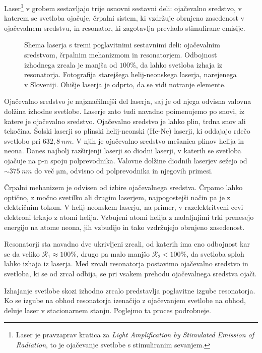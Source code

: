 Laser\footnote{Laser je pravzaprav kratica za {\it Light Amplification by Stimulated
Emission of Radiation}, to je ojačevanje svetlobe s stimuliranim sevanjem.} 
v grobem sestavljajo trije osnovni sestavni deli: ojačevalno sredstvo, 
v katerem se svetloba ojačuje, črpalni sistem, ki vzdržuje obrnjeno zasedenost
v ojačevalnem sredstvu, in resonator, ki zagotavlja prevlado stimulirane emisije.
\begin{figure}[h!]
\centering
\def\svgwidth{90truemm} 

\caption{Shema laserja s tremi poglavitnimi sestavnimi deli: ojačevalnim sredstvom, 
črpalnim mehanizmom in resonatorjem. Odbojnost izhodnega zrcala je manjša od $100\%$,
da lahko svetloba izhaja iz resonatorja. Fotografija starejšega helij-neonskega laserja, 
narejenega v Sloveniji. Ohišje laserja je odprto, da se vidi notranje elemente.
}
\label{fig:11_laser}
\end{figure}

Ojačevalno sredstvo je najznačilnejši del laserja, saj je od njega odvisna 
valovna dolžina izhodne svetlobe. Laserje zato tudi navadno poimenujemo
po snovi, iz katere je ojačevalno sredstvo.
Ojačevalno sredstvo je lahko plin, trdna snov ali tekočina.  
Šolski laserji so plinski helij-neonski (He-Ne) laserji, ki oddajajo 
rdečo svetlobo pri $632,8~\si{nm}$. V njih je ojačevalno sredstvo
mešanica plinov helija in neona. Danes najbolj razširjenji laserji so 
diodni laserji, v katerih se svetloba ojačuje na p-n spoju polprevodnika. 
Valovne dolžine diodnih laserjev sežejo od $\sim 375~\si{nm}$ do več 
$\si{\micro\meter}$, odvisno od polprevodnika in njegovih primesi.

Črpalni mehanizem je odvisen od izbire ojačevalnega sredstva. Črpamo lahko 
optično, z močno svetilko ali drugim laserjem, najpogostejši način pa je z
električnim tokom. V helij-neonskem laserju, na primer, v razelektritveni 
cevi elektroni trkajo z atomi helija. Vzbujeni atomi helija z nadaljnjimi
trki prenesejo energijo na atome neona, jih vzbudijo in tako vzdržujejo 
obrnjeno zasedenost.

Resonatorji sta navadno dve ukrivljeni zrcali, od katerih ima eno odbojnost
kar se da veliko $\mathcal{R}_1 \approx 100\%$, drugo pa malo manjšo 
$\mathcal{R}_2 < 100\%$, da svetloba sploh lahko izhaja iz laserja. 
Med zrcali resonatorja postavimo ojačevalno sredstvo in svetloba, ki se od 
zrcal odbija, se pri vsakem prehodu ojačevalnega sredstva ojači.

Izhajanje svetlobe skozi izhodno zrcalo predstavlja poglavitne izgube 
resonatorja.  Ko se izgube na obhod resonatorja izenačijo z ojačevanjem 
svetlobe na obhod, deluje laser v stacionarnem stanju. Poglejmo ta proces 
podrobneje.

